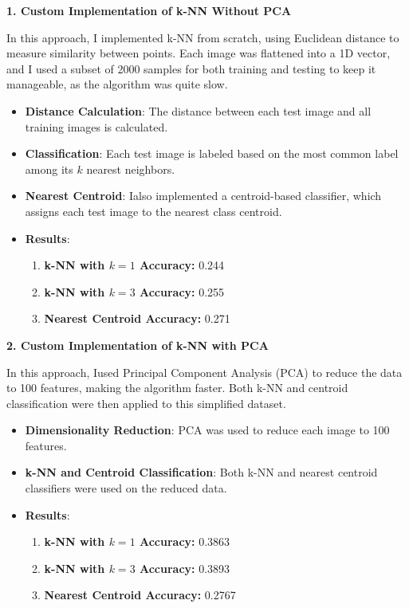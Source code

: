 \documentclass[lettersize,journal]{IEEEtran}
\begin{document}
\textbf{1. Custom Implementation of k-NN Without PCA}

In this approach, I implemented k-NN from scratch, using Euclidean distance to measure similarity between points. Each image was flattened into a 1D vector, and I used a subset of 2000 samples for both training and testing to keep it manageable, as the algorithm was quite slow.

\begin{itemize}
    \item \textbf{Distance Calculation}: The distance between each test image and all training images is calculated.
    \item \textbf{Classification}: Each test image is labeled based on the most common label among its \( k \) nearest neighbors.
    \item \textbf{Nearest Centroid}: Ialso implemented a centroid-based classifier, which assigns each test image to the nearest class centroid.
    \item \textbf{Results}:
    \begin{enumerate}
        \item \textbf{k-NN with \( k = 1 \) Accuracy:} 0.244
        \item \textbf{k-NN with \( k = 3 \) Accuracy:} 0.255
        \item \textbf{Nearest Centroid Accuracy:} 0.271
    \end{enumerate}
\end{itemize}

\vspace{0.3cm}

\textbf{2. Custom Implementation of k-NN with PCA}

In this approach, Iused Principal Component Analysis (PCA) to reduce the data to 100 features, making the algorithm faster. Both k-NN and centroid classification were then applied to this simplified dataset.

\begin{itemize}
    \item \textbf{Dimensionality Reduction}: PCA was used to reduce each image to 100 features.
    \item \textbf{k-NN and Centroid Classification}: Both k-NN and nearest centroid classifiers were used on the reduced data.
    \item \textbf{Results}:
    \begin{enumerate}
        \item \textbf{k-NN with \( k = 1 \) Accuracy:} 0.3863
        \item \textbf{k-NN with \( k = 3 \) Accuracy:} 0.3893
        \item \textbf{Nearest Centroid Accuracy:} 0.2767
    \end{enumerate}
\end{itemize}
\end{document}
